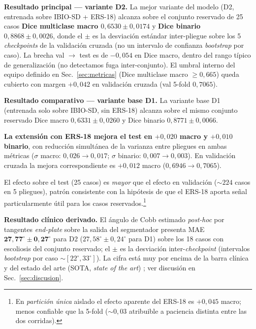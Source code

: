 \documentclass[conference]{IEEEtran}
\begin{document}
\textbf{Resultado principal — variante D2.} La mejor variante del modelo (D2, entrenada sobre IBIO-SD + ERS-18) alcanza sobre el conjunto reservado de 25 casos \textbf{Dice multiclase macro $0{,}6530 \pm 0{,}0174$} y \textbf{Dice binario $0{,}8868 \pm 0{,}0026$}, donde el $\pm$ es la desviación estándar inter-pliegue sobre los 5 \emph{checkpoints} de la validación cruzada (no un intervalo de confianza \emph{bootstrap} por caso). La brecha val $\rightarrow$ test es de $-0{,}054$ en Dice macro, dentro del rango típico de generalización (no detectamos fuga inter-conjunto). El umbral interno del equipo definido en Sec.~\ref{sec:metricas} (Dice multiclase macro $\geq 0{,}665$) queda cubierto con margen $+0{,}042$ en validación cruzada (val 5-fold $0{,}7065$).

\textbf{Resultado comparativo — variante base D1.} La variante base D1 (entrenada solo sobre IBIO-SD, sin ERS-18) alcanza sobre el mismo conjunto reservado Dice macro $0{,}6331 \pm 0{,}0260$ y Dice binario $0{,}8771 \pm 0{,}0066$.

\textbf{La extensión con ERS-18 mejora el test en $+0{,}020$ macro y $+0{,}010$ binario}, con reducción simultánea de la varianza entre pliegues en ambas métricas ($\sigma$ macro: $0{,}026 \rightarrow 0{,}017$; $\sigma$ binario: $0{,}007 \rightarrow 0{,}003$). En validación cruzada la mejora correspondiente es $+0{,}012$ macro ($0{,}6946 \rightarrow 0{,}7065$).

El efecto sobre el test (25 casos) es \emph{mayor} que el efecto en validación ($\sim 224$ casos en 5 pliegues), patrón consistente con la hipótesis de que el ERS-18 aporta señal particularmente útil para los casos reservados.\footnote{En \emph{partición única} aislado el efecto aparente del ERS-18 es $+0{,}045$ macro; menos confiable que la 5-fold ($\sim 0{,}03$ atribuible a paciencia distinta entre las dos corridas).}

\textbf{Resultado clínico derivado.} El ángulo de Cobb estimado \emph{post-hoc} por tangentes \emph{end-plate} sobre la salida del segmentador presenta MAE $\mathbf{27{,}77^{\circ} \pm 0{,}27^{\circ}}$ para D2 ($27{,}58^{\circ} \pm 0{,}24^{\circ}$ para D1) sobre los 18 casos con escoliosis del conjunto reservado; el $\pm$ es la desviación inter-\emph{checkpoint} (intervalos \emph{bootstrap} por caso $\sim [22^{\circ},33^{\circ}]$). La cifra está muy por encima de la barra clínica \cite{cobb_interrater} y del estado del arte (SOTA, \emph{state of the art}) \cite{meta_cobb}; ver discusión en Sec.~\ref{sec:discusion}.
\end{document}

